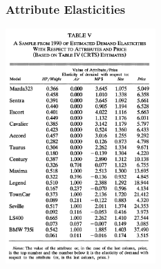 \documentclass{beamer}
\begin{document}
\begin{frame}\frametitle{Attribute Elasticities}
    \centering
    \includegraphics[width=0.43\textwidth]{attribute_elasticities.png}
\end{frame}
\end{document}
